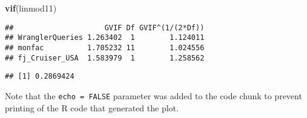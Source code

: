 \documentclass[]{article}
\newenvironment{Shaded}{\begin{snugshade}}{\end{snugshade}}
\newcommand{\KeywordTok}[1]{\textcolor[rgb]{0.13,0.29,0.53}{\textbf{#1}}}
\newcommand{\DataTypeTok}[1]{\textcolor[rgb]{0.13,0.29,0.53}{#1}}
\newcommand{\DecValTok}[1]{\textcolor[rgb]{0.00,0.00,0.81}{#1}}
\newcommand{\StringTok}[1]{\textcolor[rgb]{0.31,0.60,0.02}{#1}}
\newcommand{\CommentTok}[1]{\textcolor[rgb]{0.56,0.35,0.01}{\textit{#1}}}
\newcommand{\OperatorTok}[1]{\textcolor[rgb]{0.81,0.36,0.00}{\textbf{#1}}}
\newcommand{\NormalTok}[1]{#1}
\begin{document}
\begin{Shaded}
\begin{Highlighting}[]
\KeywordTok{vif}\NormalTok{(linmod11)}
\end{Highlighting}
\end{Shaded}

\begin{verbatim}
##                     GVIF Df GVIF^(1/(2*Df))
## WranglerQueries 1.263402  1        1.124011
## monfac          1.705232 11        1.024556
## fj_Cruiser_USA  1.583979  1        1.258562
\end{verbatim}

\begin{Shaded}
\end{Shaded}

\begin{verbatim}
## [1] 0.2869424
\end{verbatim}

Note that the \texttt{echo\ =\ FALSE} parameter was added to the code
chunk to prevent printing of the R code that generated the plot.
\end{document}
